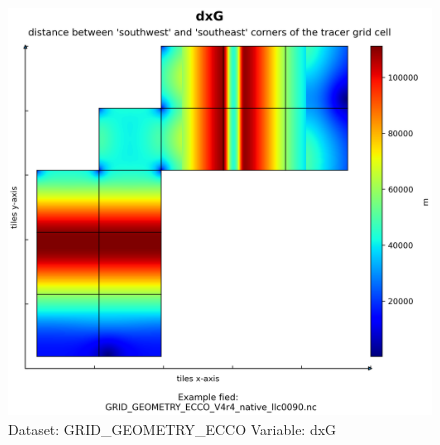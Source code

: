 \begin{figure}[H]
\centering
\includegraphics[width=\textwidth]{../images/plots/native_plots_coords/Geometry_Parameters_for_the_Lat-Lon-Cap_90_(llc90)_Native_Model_Grid_(Version_4_Release_4)/dxG.png}
\caption{Dataset: GRID\_GEOMETRY\_ECCO Variable: dxG}
\label{tab:table-GRID_GEOMETRY_ECCO_dxG-Plot}
\end{figure}
\pagebreak
